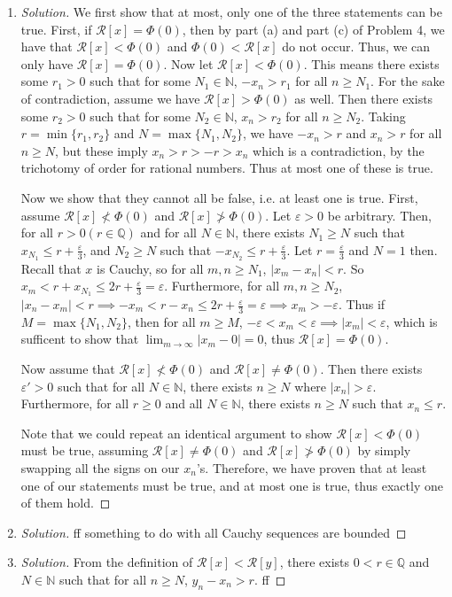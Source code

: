 \documentclass{article}
\newcommand{\N}{{\mathbb N}}
\newcommand{\Q}{{\mathbb Q}}
\newcommand{\ep}{{\varepsilon}}
\newcommand{\SR}{{\mathcal R}}
\begin{document}
\begin{enumerate}
	\item \begin{proof}[Solution]\let\qed\relax
		We first show that at most,
		only one of the three statements can be true.
		First, if $\SR[x] = \Phi(0)$,
		then by part (a) and part (c) of Problem 4,
		we have that $\SR[x] < \Phi(0)$ and $\Phi(0) < \SR[x]$
		do not occur.
		Thus, we can only have $\SR[x] = \Phi(0)$.
		Now let $\SR[x] < \Phi(0)$.
		This means there exists some $r_1>0$ such that for some $N_1 \in \N$,
		$-x_n > r_1$ for all $n \geq N_1$.
		For the sake of contradiction, assume we have $\SR[x] > \Phi(0)$
		as well.
		Then there exists some $r_2>0$ such that for some $N_2 \in \N$,
		$x_n > r_2$ for all $n \geq N_2$.
		Taking $r = \min\{r_1,r_2\}$ and $N = \max\{N_1,N_2\}$,
		we have $-x_n > r$ and $x_n > r$ for all $n \geq N$,
		but these imply $x_n > r > -r > x_n$ which is a contradiction,
		by the trichotomy of order for rational numbers.
		Thus at most one of these is true.

		Now we show that they cannot all be false, i.e. at least one is true.
		First, assume $\SR[x] \not< \Phi(0)$ and $\SR[x] \not> \Phi(0)$.
		Let $\ep > 0$ be arbitrary.
		Then, for all $r > 0 (r \in \Q)$ and for all $N \in \N$,
		there exists $N_1 \geq N$ such that $x_{N_1} \leq r + \frac{\ep}{3}$,
		and $N_2 \geq N$ such that $-x_{N_2} \leq r + \frac{\ep}{3}$.
		Let $r = \frac{\ep}{3}$ and $N = 1$ then.
		Recall that $x$ is Cauchy,
		so for all $m,n \geq N_1$, $|x_m-x_n| < r$.
		So $x_m < r + x_{N_1} \leq 2r + \frac{\ep}{3} = \ep$.
		Furthermore, for all $m,n \geq N_2$, $|x_n - x_m| < r \implies
		-x_m < r - x_n \leq 2r + \frac{\ep}{3} = \ep \implies x_m > -\ep$.
		Thus if $M = \max\{N_1,N_2\}$, then for all $m \geq M$,
		$-\ep < x_m < \ep \implies |x_m| < \ep$,
		which is sufficent to show that $\lim_{m\to\infty}|x_m - 0| = 0$,
		thus $\SR[x] = \Phi(0)$.

		Now assume that $\SR[x] \not< \Phi(0)$ and $\SR[x] \neq \Phi(0)$.
		Then there exists $\ep' > 0$ such that for all $N \in \N$,
		there exists $n \geq N$ where $|x_n| > \ep$.
		Furthermore, for all $r \geq 0$ and all $N \in \N$,
		there exists $n \geq N$ such that $x_n \leq r$.
		
		Note that we could repeat an identical argument to show $\SR[x] < \Phi(0)$
		must be true, assuming $\SR[x] \neq \Phi(0)$ and $\SR[x] \not> \Phi(0)$
		by simply swapping all the signs on our $x_n$'s.
		Therefore, we have proven that at least one of our statements
		must be true, and at most one is true,
		thus exactly one of them hold.
	\end{proof}
	\item \begin{proof}[Solution]\let\qed\relax
		ff something to do with all Cauchy sequences are bounded
	\end{proof}
	\item \begin{proof}[Solution]\let\qed\relax
		From the definition of $\SR[x] < \SR[y]$,
		there exists $0 < r \in \Q$ and $N \in \N$
		such that for all $n \geq N$,
		$y_n - x_n > r$.
		ff



\end{proof}
\end{enumerate}
\end{document}
